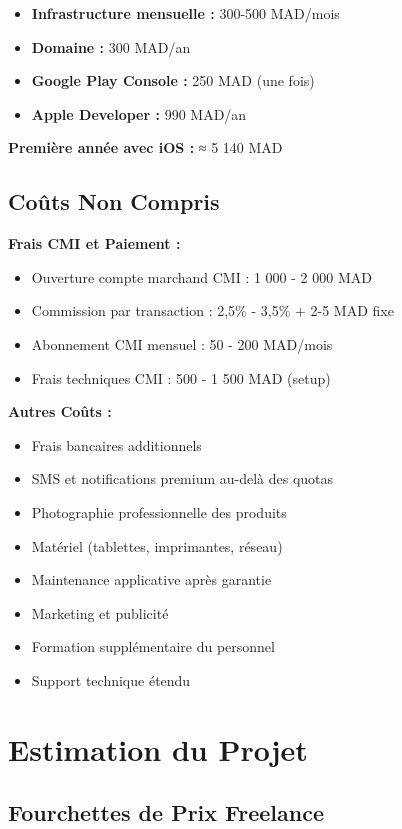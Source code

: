 \documentclass[11pt,a4paper]{article}
\begin{document}
\begin{itemize}
    \item \textbf{Infrastructure mensuelle :} 300-500 MAD/mois
    \item \textbf{Domaine :} 300 MAD/an
    \item \textbf{Google Play Console :} 250 MAD (une fois)
    \item \textbf{Apple Developer :} 990 MAD/an
\end{itemize}

\textbf{Première année avec iOS :} ≈ 5 140 MAD

\subsection{Coûts Non Compris}

\textbf{Frais CMI et Paiement :}
\begin{itemize}
    \item Ouverture compte marchand CMI : 1 000 - 2 000 MAD
    \item Commission par transaction : 2,5\% - 3,5\% + 2-5 MAD fixe
    \item Abonnement CMI mensuel : 50 - 200 MAD/mois
    \item Frais techniques CMI : 500 - 1 500 MAD (setup)
\end{itemize}

\textbf{Autres Coûts :}
\begin{itemize}
    \item Frais bancaires additionnels
    \item SMS et notifications premium au-delà des quotas
    \item Photographie professionnelle des produits
    \item Matériel (tablettes, imprimantes, réseau)
    \item Maintenance applicative après garantie
    \item Marketing et publicité
    \item Formation supplémentaire du personnel
    \item Support technique étendu
\end{itemize}

\section{Estimation du Projet}

\subsection{Fourchettes de Prix Freelance}
\end{document}
